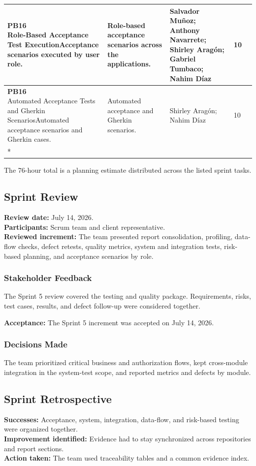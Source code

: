 \documentclass[letterpaper%
, oneside%
, 12pt%
, memoireprojet%
, english%
,creativecommons,hyperref, withAlgo2e %
]{thETS}
\newcommand{\tablelastrow}{%
    \\* \hline
}
\newcommand{\pbhu}[3]{%
    #1 &
    #2%
}
\begin{document}
\begin{longtable}{|L{1.0cm}|L{4.0cm}|L{5.4cm}|L{2.7cm}|L{1.3cm}|}
\hline
\pbhu{8}{\textbf{PB16}\newline Role-Based Acceptance Test Execution}{Acceptance scenarios executed by user role.} & Role-based acceptance scenarios across the applications. & Salvador Muñoz; Anthony Navarrete; Shirley Aragón; Gabriel Tumbaco; Nahim Díaz & 10 \\
\hline
\pbhu{9}{\textbf{PB16}\newline Automated Acceptance Tests and Gherkin Scenarios}{Automated acceptance scenarios and Gherkin cases.} & Automated acceptance and Gherkin scenarios. & Shirley Aragón; Nahim Díaz & 10 \tablelastrow
\end{longtable}
\endgroup

The 76-hour total is a planning estimate distributed across the listed sprint tasks.

\subsection{Sprint Review}
\textbf{Review date:} July 14, 2026.\\
\textbf{Participants:} Scrum team and client representative.\\
\textbf{Reviewed increment:} The team presented report consolidation, profiling, data-flow checks,
defect retests, quality metrics, system and integration tests, risk-based planning, and acceptance
scenarios by role.

\subsubsection{Stakeholder Feedback}
The Sprint 5 review covered the testing and quality package. Requirements, risks, test cases,
results, and defect follow-up were considered together.

\textbf{Acceptance:} The Sprint 5 increment was accepted on July 14, 2026.

\subsubsection{Decisions Made}
The team prioritized critical business and authorization flows, kept cross-module integration in
the system-test scope, and reported metrics and defects by module.

\subsection{Sprint Retrospective}
\textbf{Successes:} Acceptance, system, integration, data-flow, and risk-based testing were organized together.\\
\textbf{Improvement identified:} Evidence had to stay synchronized across repositories and report sections.\\
\textbf{Action taken:} The team used traceability tables and a common evidence index.
\end{document}
